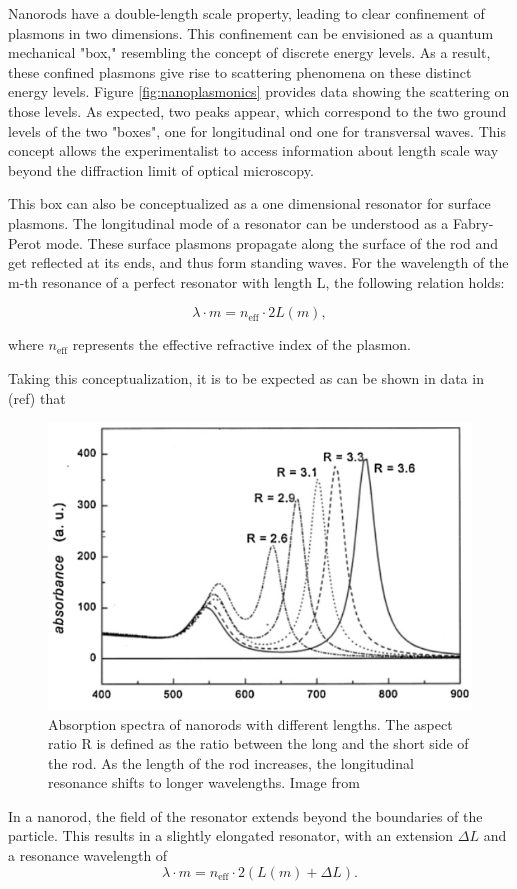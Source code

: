 Nanorods have a double-length scale property, leading to clear confinement of plasmons in two dimensions. This confinement can be envisioned as a quantum mechanical "box," resembling the concept of discrete energy levels. As a result, these confined plasmons give rise to scattering phenomena on these distinct energy levels. Figure \ref{fig:nanoplasmonics} provides data showing the scattering on those levels. As expected, two peaks appear, which correspond to the two ground levels of the two "boxes", one for longitudinal ond one for transversal waves.
This concept allows the experimentalist to access information about length scale way beyond the diffraction limit of optical microscopy.

This box can also be conceptualized as a one dimensional resonator for surface plasmons.
The longitudinal mode of a resonator can be understood as a Fabry-Perot mode. These surface plasmons propagate along the surface of the rod and get reflected at its ends, and thus form standing waves. For the wavelength of the m-th resonance of a perfect resonator with length L, the following relation holds:

\begin{equation}
    \lambda\cdot m = n_{\mathrm{eff}}\cdot 2L(m),
\end{equation}

where $n_{\mathrm{eff}}$ represents the effective refractive index of the plasmon.

Taking this conceptualization, it is to be expected as can be shown in data in (ref) that 

\begin{figure}
    \centering
    \includegraphics[width = 12cm]{Bilder/Theory/NanorodResonator.png}
    \caption{Absorption spectra of nanorods with different lengths. The aspect ratio R is defined as the ratio between the long and the short side of the rod. As the length of the rod increases, the longitudinal resonance shifts to longer wavelengths. Image from \cite{Link.1999}}
    \label{fig:NanorodResonator}
\end{figure}

In a nanorod, the field of the resonator extends beyond the boundaries of the particle. This results in a slightly elongated resonator, with an extension $\Delta L$ and a resonance wavelength of
\begin{equation}
    \lambda\cdot m = n_{\mathrm{eff}}\cdot 2(L(m)+\Delta L).
\end{equation}

